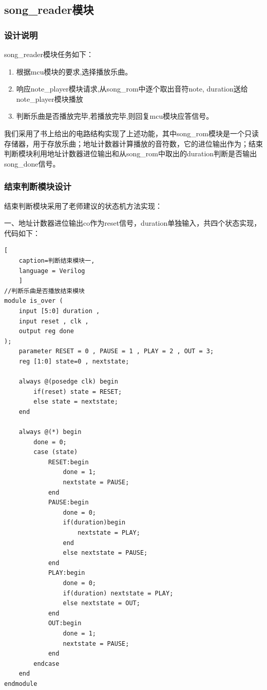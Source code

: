 \documentclass{ctexart}
\begin{document}
        \subsection{song_reader模块}
            \subsubsection{设计说明}
            song_reader模块任务如下：
            \begin{enumerate}
                \item 根据mcu模块的要求,选择播放乐曲。
                \item 响应note_player模块请求,从song_rom中逐个取出音符{note, duration}送给note_player模块播放
                \item 判断乐曲是否播放完毕,若播放完毕,则回复mcu模块应答信号。
            \end{enumerate}


            我们采用了书上给出的电路结构实现了上述功能，其中song_rom模块是一个只读存储器，用于存放乐曲；地址计数器计算播放的音符数，它的进位输出作为；结束判断模块利用地址计数器进位输出和从song_rom中取出的duration判断是否输出song_done信号。

            \subsubsection{结束判断模块设计}
            结束判断模块采用了老师建议的状态机方法实现：


            一、地址计数器进位输出co作为reset信号，duration单独输入，共四个状态实现，代码如下：
\begin{lstlisting}[
    caption=判断结束模块一,
    language = Verilog
    ]
//判断乐曲是否播放结束模块
module is_over (
    input [5:0] duration ,
    input reset , clk ,
    output reg done
);
    parameter RESET = 0 , PAUSE = 1 , PLAY = 2 , OUT = 3;
    reg [1:0] state=0 , nextstate;

    always @(posedge clk) begin
        if(reset) state = RESET;
        else state = nextstate;
    end

    always @(*) begin
        done = 0;
        case (state)
            RESET:begin
                done = 1;
                nextstate = PAUSE;
            end 
            PAUSE:begin
                done = 0;
                if(duration)begin
                    nextstate = PLAY;
                end
                else nextstate = PAUSE;
            end
            PLAY:begin
                done = 0;
                if(duration) nextstate = PLAY;
                else nextstate = OUT;
            end
            OUT:begin
                done = 1;
                nextstate = PAUSE;
            end
        endcase
    end
endmodule
\end{lstlisting}
\end{document}

